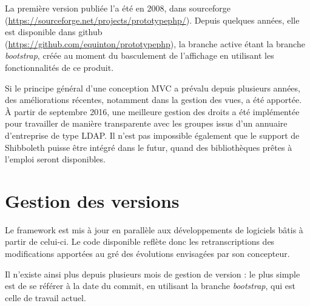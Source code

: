 La première version publiée l'a été en 2008, dans sourceforge \\ (\url{https://sourceforge.net/projects/prototypephp/}). Depuis quelques années, elle est disponible dans github \\(\url{https://github.com/equinton/prototypephp}), la branche active étant la branche \textit{bootstrap}, créée au moment du basculement de l'affichage en utilisant les fonctionnalités de ce produit.

Si le principe général d'une conception MVC a prévalu depuis plusieurs années, des améliorations récentes, notamment dans la gestion des vues, a été apportée. À partir de septembre 2016, une meilleure gestion des droits a été implémentée pour travailler de manière transparente avec les groupes issus d'un annuaire d'entreprise de type LDAP. 
Il n'est pas impossible également que le support de Shibboleth puisse être intégré dans le futur, quand des bibliothèques prêtes à l'emploi seront disponibles.

\section{Gestion des versions}

Le framework est mis à jour en parallèle aux développements de logiciels bâtis à partir de celui-ci. Le code disponible reflète donc les retranscriptions des modifications apportées au gré des évolutions envisagées par son concepteur.

Il n'existe ainsi plus depuis plusieurs mois de gestion de version : le plus simple est de se référer à la date du commit, en utilisant la branche \textit{bootstrap}, qui est celle de travail actuel.


